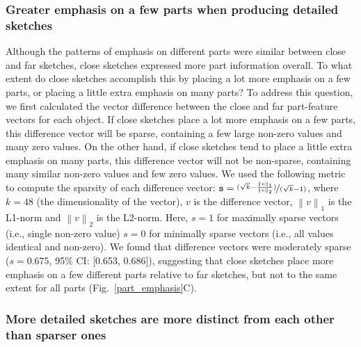 \documentclass[10pt,letterpaper]{article}
\newcommand\norm[1]{\left\lVert#1\right\rVert}
\begin{document}
\subsubsection{Greater emphasis on a few parts when producing detailed sketches}

Although the patterns of emphasis on different parts were similar between close and far sketches, close sketches expressed more part information overall.
To what extent do close sketches accomplish this by placing a lot more emphasis on a few parts, or placing a little extra emphasis on many parts?
To address this question, we first calculated the vector difference between the close and far part-feature vectors for each object.
If close sketches place a lot more emphasis on a few parts, this difference vector will be sparse, containing a few large non-zero values and many zero values. 
On the other hand, if close sketches tend to place a little extra emphasis on many parts, this difference vector will not be non-sparse, containing many similar non-zero values and few zero values. 
We used the following metric to compute the sparsity of each difference vector:
$\texttt{s}= \nicefrac{(\sqrt{k} - \frac{\norm{v}_1}{\norm{v}_2})}{(\sqrt{k}-1)}$, where $k=48$ (the dimensionality of the vector), $v$ is the difference vector, $\norm{v}_1$ is the L1-norm and $\norm{v}_2$ is the L2-norm. 
Here, $s=1$ for maximally sparse vectors (i.e., single non-zero value) $s=0$ for minimally sparse vectors (i.e., all values identical and non-zero).
We found that difference vectors were moderately sparse ($s=0.675$, 95\% CI: [0.653, 0.686]), suggesting that close sketches place more emphasis on a few different parts relative to far sketches, but not to the same extent for all parts (Fig.~\ref{part_emphasis}C).

\subsubsection{More detailed sketches are more distinct from each other than sparser ones}
\end{document}
